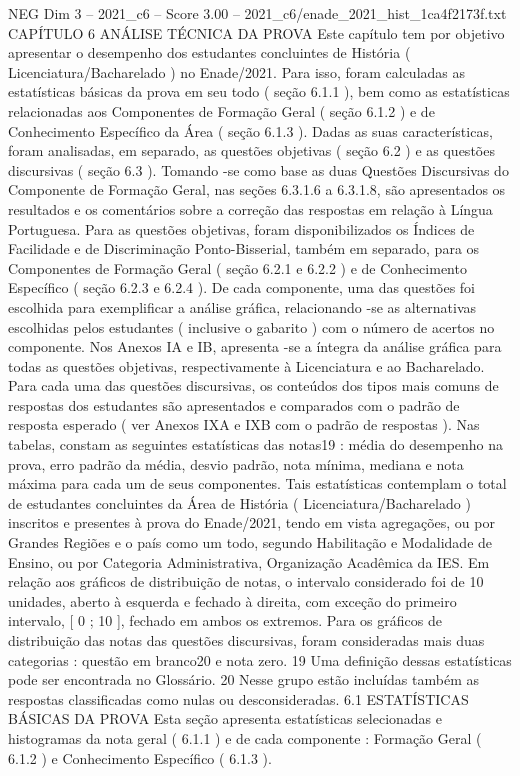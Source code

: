 \begin{textsample}{NEG Dim 3 – 2021\_c6 – Score 3.00 – 2021\_c6/enade\_2021\_hist\_1ca4f2173f.txt}  \label{ex:f3_neg_244}
CAPÍTULO 6 ANÁLISE TÉCNICA DA PROVA Este capítulo tem por objetivo apresentar o desempenho dos estudantes concluintes de História ( Licenciatura/Bacharelado ) no Enade/2021.
Para isso, foram calculadas as estatísticas básicas da prova em seu todo ( seção 6.1.1 ), bem como as estatísticas relacionadas aos Componentes de Formação Geral ( seção 6.1.2 ) e de Conhecimento Específico da Área ( seção 6.1.3 ).
Dadas as suas características, foram analisadas, em separado, as questões objetivas ( seção 6.2 ) e as questões discursivas ( seção 6.3 ).
Tomando -se como base as duas Questões Discursivas do Componente de Formação Geral, nas seções 6.3.1.6 a 6.3.1.8, são apresentados os resultados e os comentários sobre a correção das respostas em relação à Língua Portuguesa.
Para as questões objetivas, foram disponibilizados os Índices de Facilidade e de Discriminação Ponto-Bisserial, também em separado, para os Componentes de Formação Geral ( seção 6.2.1 e 6.2.2 ) e de Conhecimento Específico ( seção 6.2.3 e 6.2.4 ).
De cada componente, uma das questões foi escolhida para exemplificar a análise gráfica, relacionando -se as alternativas escolhidas pelos estudantes ( inclusive o gabarito ) com o número de acertos no componente.
Nos Anexos IA e IB, apresenta -se a íntegra da análise gráfica para todas as questões objetivas, respectivamente à Licenciatura e ao Bacharelado.
Para cada uma das questões discursivas, os conteúdos dos tipos mais comuns de respostas dos estudantes são apresentados e comparados com o padrão de resposta esperado ( ver Anexos IXA e IXB com o padrão de respostas ).
Nas tabelas, constam as seguintes estatísticas das notas19 : média do desempenho na prova, erro padrão da média, desvio padrão, nota mínima, mediana e nota máxima para cada um de seus componentes.
Tais estatísticas contemplam o total de estudantes concluintes da Área de História ( Licenciatura/Bacharelado ) inscritos e presentes à prova do Enade/2021, tendo em vista agregações, ou por Grandes Regiões e o país como um todo, segundo Habilitação e Modalidade de Ensino, ou por Categoria Administrativa, Organização Acadêmica da IES.
Em relação aos gráficos de distribuição de notas, o intervalo considerado foi de 10 unidades, aberto à esquerda e fechado à direita, com exceção do primeiro intervalo, [ 0 ; 10 ], fechado em ambos os extremos.
Para os gráficos de distribuição das notas das questões discursivas, foram consideradas mais duas categorias : questão em branco20 e nota zero. 19 Uma definição dessas estatísticas pode ser encontrada no Glossário. 20 Nesse grupo estão incluídas também as respostas classificadas como nulas ou desconsideradas. 6.1 ESTATÍSTICAS BÁSICAS DA PROVA Esta seção apresenta estatísticas selecionadas e histogramas da nota geral ( 6.1.1 ) e de cada componente : Formação Geral ( 6.1.2 ) e Conhecimento Específico ( 6.1.3 ).

\end{textsample}
